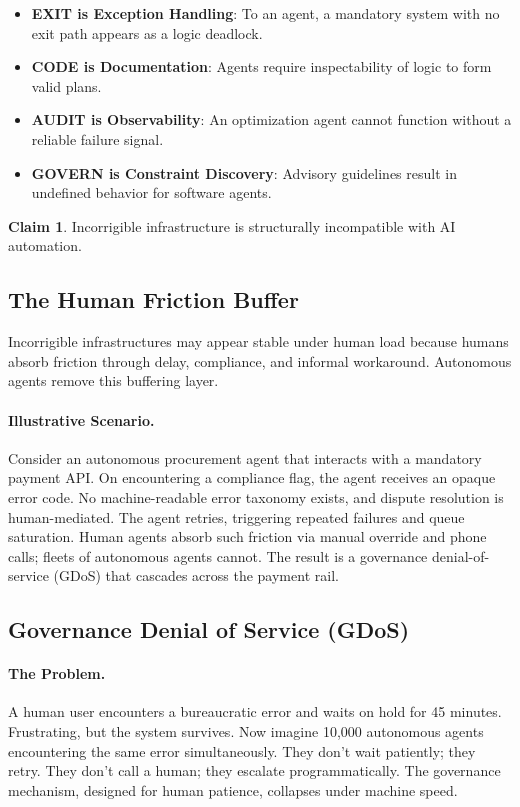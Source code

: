 \documentclass[11pt,a4paper]{article}
\theoremstyle{definition}
\newtheorem{claim}{Claim}[section]
\begin{document}
\begin{itemize}[noitemsep]
    \item \textbf{EXIT is Exception Handling}: To an agent, a mandatory system with no exit path appears as a logic deadlock.
    \item \textbf{CODE is Documentation}: Agents require inspectability of logic to form valid plans.
    \item \textbf{AUDIT is Observability}: An optimization agent cannot function without a reliable failure signal.
    \item \textbf{GOVERN is Constraint Discovery}: Advisory guidelines result in undefined behavior for software agents.
\end{itemize}

\begin{claim}
Incorrigible infrastructure is structurally incompatible with AI automation.
\end{claim}

\subsection{The Human Friction Buffer}

Incorrigible infrastructures may appear stable under human load because humans absorb friction through delay, compliance, and informal workaround. Autonomous agents remove this buffering layer.

\paragraph{Illustrative Scenario.} Consider an autonomous procurement agent that interacts with a mandatory payment API. On encountering a compliance flag, the agent receives an opaque error code. No machine-readable error taxonomy exists, and dispute resolution is human-mediated. The agent retries, triggering repeated failures and queue saturation. Human agents absorb such friction via manual override and phone calls; fleets of autonomous agents cannot. The result is a governance denial-of-service (GDoS) that cascades across the payment rail.

\subsection{Governance Denial of Service (GDoS)}

\paragraph{The Problem.} A human user encounters a bureaucratic error and waits on hold for 45 minutes. Frustrating, but the system survives. Now imagine 10,000 autonomous agents encountering the same error simultaneously. They don't wait patiently; they retry. They don't call a human; they escalate programmatically. The governance mechanism, designed for human patience, collapses under machine speed.
\end{document}
